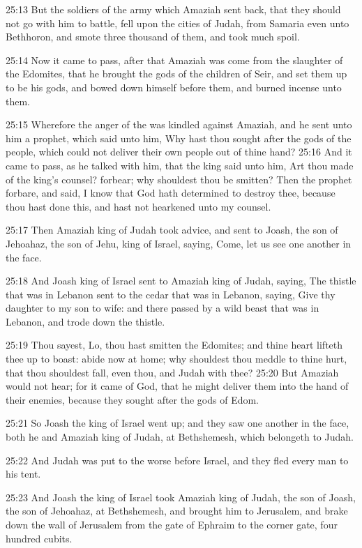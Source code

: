 25:13 But the soldiers of the army which Amaziah sent back, that they
should not go with him to battle, fell upon the cities of Judah, from
Samaria even unto Bethhoron, and smote three thousand of them, and
took much spoil.

25:14 Now it came to pass, after that Amaziah was come from the
slaughter of the Edomites, that he brought the gods of the children of
Seir, and set them up to be his gods, and bowed down himself before
them, and burned incense unto them.

25:15 Wherefore the anger of the \LORD was kindled against Amaziah, and
he sent unto him a prophet, which said unto him, Why hast thou sought
after the gods of the people, which could not deliver their own people
out of thine hand?  25:16 And it came to pass, as he talked with him,
that the king said unto him, Art thou made of the king's counsel?
forbear; why shouldest thou be smitten? Then the prophet forbare, and
said, I know that God hath determined to destroy thee, because thou
hast done this, and hast not hearkened unto my counsel.

25:17 Then Amaziah king of Judah took advice, and sent to Joash, the
son of Jehoahaz, the son of Jehu, king of Israel, saying, Come, let us
see one another in the face.

25:18 And Joash king of Israel sent to Amaziah king of Judah, saying,
The thistle that was in Lebanon sent to the cedar that was in Lebanon,
saying, Give thy daughter to my son to wife: and there passed by a
wild beast that was in Lebanon, and trode down the thistle.

25:19 Thou sayest, Lo, thou hast smitten the Edomites; and thine heart
lifteth thee up to boast: abide now at home; why shouldest thou meddle
to thine hurt, that thou shouldest fall, even thou, and Judah with
thee?  25:20 But Amaziah would not hear; for it came of God, that he
might deliver them into the hand of their enemies, because they sought
after the gods of Edom.

25:21 So Joash the king of Israel went up; and they saw one another in
the face, both he and Amaziah king of Judah, at Bethshemesh, which
belongeth to Judah.

25:22 And Judah was put to the worse before Israel, and they fled
every man to his tent.

25:23 And Joash the king of Israel took Amaziah king of Judah, the son
of Joash, the son of Jehoahaz, at Bethshemesh, and brought him to
Jerusalem, and brake down the wall of Jerusalem from the gate of
Ephraim to the corner gate, four hundred cubits.

